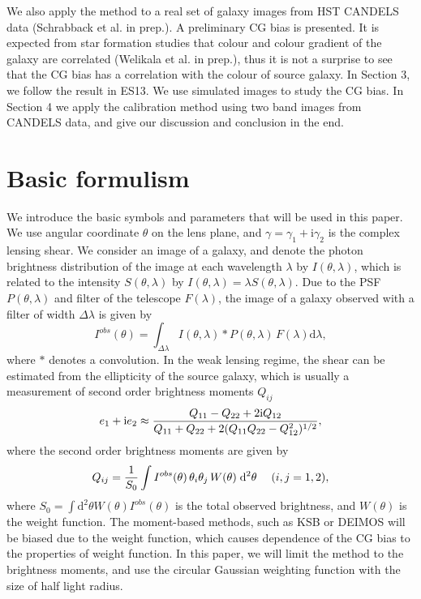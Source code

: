 \documentclass[useAMS,usenatbib]{mn2e}
\renewcommand{\d}{\mathrm{d}}
\newcommand{\ii}{\mathrm{i}}
\newcommand{\be}{\begin{equation}}
\newcommand{\ee}{\end{equation}}
\def\elabel#1{\label{eq:#1}}
\begin{document}
We also apply the method to a real set of galaxy images from HST
CANDELS data (Schrabback et al. in prep.). A preliminary CG bias is
presented. It is expected from star formation studies that colour and
colour gradient of the galaxy are correlated (Welikala et al. in prep.), thus it
is not a surprise to see that the CG bias has a correlation with the
colour of source galaxy. In Section 3, we follow the result in
ES13. We use
simulated images to study the CG bias. In Section 4 we apply the
calibration method using two band images from CANDELS data, and give
our discussion and conclusion in the end.


\section{Basic formulism}
We introduce the basic symbols and parameters that will be used in
this paper.  We use angular coordinate $\theta$ on the lens plane, and
$\gamma=\gamma_1 + \ii \gamma_2$ is the complex lensing shear. We
consider an image of a galaxy, and denote the photon brightness
distribution of the image at each wavelength $\lambda$ by
$I(\theta,\lambda)$, which is related to the intensity
$S(\theta,\lambda)$ by $I(\theta,\lambda)=\lambda S(\theta,\lambda)$.
Due to the PSF $P(\theta,\lambda)$ and filter of the telescope
$F(\lambda)$, the image of a galaxy observed with a filter of width
$\Delta \lambda$ is given by
%
\be
I^{obs}(\theta) = \int_{\Delta\lambda} I(\theta, \lambda) *  P(\theta,\lambda)
\, F(\lambda)\d \lambda,
\elabel{iobs}
\ee
%
where $*$ denotes a convolution. In the weak lensing regime, the
shear can be estimated from the ellipticity of the source galaxy,
which is usually a measurement of second order brightness moments
$Q_{ij}$ \citep{2001PhR...340..291B}
%
\be
e_1+\ii e_2 \approx
{Q_{11} - Q_{22} + 2 \ii Q_{12} \over Q_{11} + Q_{22} +2(Q_{11}Q_{22} - Q_{12}^2)^{1/2} },
\elabel{mshear}
\ee
%
where the second order brightness moments are given by
%
\be
Q_{ij} = {1 \over S_0} \int  I^{obs}(\theta)\, \theta_i \theta_j \, W(\theta)\; \d^2 \theta \quad\; (i,j=1,2),
\ee
%
where $S_0=\int \d^2\theta W(\theta) I^{obs}(\theta)$ is the total observed
brightness, and $W(\theta)$ is the weight function. The moment-based
methods, such as KSB \citep{1995ApJ...449..460K} or DEIMOS
\citep{2011MNRAS.412.1552M} will be biased due to the weight function,
which causes dependence of the CG bias to the properties of weight
function.  In this paper, we will limit the method to the brightness
moments, and use the circular Gaussian weighting function with the
size of half light radius.
\end{document}
